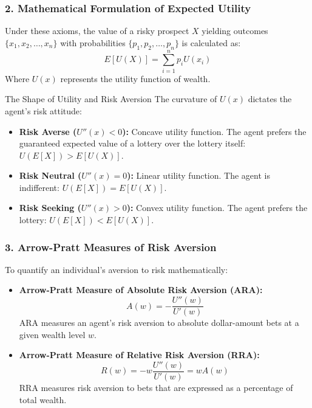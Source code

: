 \documentclass[11pt,a4paper]{article}
\begin{document}
\subsubsection{2. Mathematical Formulation of Expected Utility}
Under these axioms, the value of a risky prospect $X$ yielding outcomes $\{x_1, x_2, \dots, x_n\}$ with probabilities $\{p_1, p_2, \dots, p_n\}$ is calculated as:
\begin{equation}
    E[U(X)] = \sum_{i=1}^{n} p_i U(x_i)
\end{equation}
Where $U(x)$ represents the utility function of wealth. 

\begin{academicbox}{The Shape of Utility and Risk Aversion}
The curvature of $U(x)$ dictates the agent's risk attitude:
\begin{itemize}
    \item \textbf{Risk Averse ($U''(x) < 0$):} Concave utility function. The agent prefers the guaranteed expected value of a lottery over the lottery itself: $U(E[X]) > E[U(X)]$.
    \item \textbf{Risk Neutral ($U''(x) = 0$):} Linear utility function. The agent is indifferent: $U(E[X]) = E[U(X)]$.
    \item \textbf{Risk Seeking ($U''(x) > 0$):} Convex utility function. The agent prefers the lottery: $U(E[X]) < E[U(X)]$.
\end{itemize}
\end{academicbox}

\subsubsection{3. Arrow-Pratt Measures of Risk Aversion}
To quantify an individual's aversion to risk mathematically:
\begin{itemize}
    \item \textbf{Arrow-Pratt Measure of Absolute Risk Aversion (ARA):}
    \begin{equation}
        A(w) = -\frac{U''(w)}{U'(w)}
    \end{equation}
    ARA measures an agent's risk aversion to absolute dollar-amount bets at a given wealth level $w$.
    
    \item \textbf{Arrow-Pratt Measure of Relative Risk Aversion (RRA):}
    \begin{equation}
        R(w) = -w \frac{U''(w)}{U'(w)} = w A(w)
    \end{equation}
    RRA measures risk aversion to bets that are expressed as a percentage of total wealth.
\end{itemize}
\end{document}
